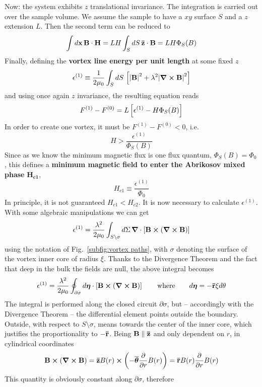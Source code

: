 Now: the system exhibits $z$ translational invariance. The integration is carried out over the sample volume. We assume the sample to have a $xy$ surface $S$ and a $z$ extension $L$. Then the second term can be reduced to
\[  
    \int d\mathbf{x} \,\mathbf{B}\cdot\mathbf{H} = LH \int_{S} dS \, \mathbf{\bar{z}}\cdot\mathbf{B} = LH \Phi_{S} (B)
\]
Finally, defining the \textbf{vortex line energy per unit length} at some fixed $z$
\[
    \epsilon^{(1)} \equiv \frac{1}{2\mu_0} \int_S dS \, \left[{ \abs{\mathbf{B}}^2 + \lambda^2 \abs{\curl\mathbf{B}}^2}\right]
\]
and using once again $z$ invariance, the resulting equation reads
\begin{equation}\label{eq:one fluxon free energy intermediate passage}
    F^{(1)} - F^{(0)} = L \left[{\epsilon^{(1)} - H \Phi_{S} (B)}\right]
\end{equation}
In order to create one vortex, it must be $F^{(1)} - F^{(0)} < 0$, i.e.
\[
    H > \frac{\epsilon^{(1)}}{\Phi_{S} (B)}
\]
Since as we know the minimum magnetic flux is one flux quantum, $\Phi_{S} (B) = \Phi_0$, this defines a \textbf{minimum magnetic field to enter the Abrikosov mixed phase} $\mathbf{H_{c1}}$,
\[
    H_{c1} \equiv \frac{\epsilon^{(1)}}{\Phi_0}
\]
In principle, it is not guaranteed $H_{c1} < H_{c2}$. It is now necessary to calculate $\epsilon^{(1)}$. With some algebraic manipulations we can get
\[  
    \epsilon^{(1)} = \frac{\lambda^2}{2\mu_0} \int_{S\setminus\sigma} d\Sigma \, \grad \cdot \left[{ \mathbf{B} \bm{\times} \left({\curl\mathbf{B}}\right) }\right]
\]
using the notation of Fig.~\ref{subfig:vortex paths}, with $\sigma$ denoting the surface of the vortex inner core of radius $\xi$. Thanks to the Divergence Theorem and the fact that deep in the bulk the fields are null, the above integral becomes
\[
    \epsilon^{(1)} = \frac{\lambda^2}{2\mu_0} \oint_{\partial\sigma} d\bm\eta \cdot \lrS{ \mathbf{B} \bm{\times} \lrR{\curl\mathbf{B}} }
    \quad\qq{where}\quad
    d\bm\eta = - \versor{r} \xi d\theta 
\]
The integral is performed along the closed circuit $\partial\sigma$, but -- accordingly with the Divergence Theorem -- the differential element points outside the boundary. Outside, with respect to $S\setminus\sigma$, means towards the center of the inner core, which justifies the proportionality to $-\mathbf{\bar{r}}$. Being $\mathbf{B}\parallel\mathbf{\bar{z}}$ and only dependent on $r$, in cylindrical coordinates
\[  
    \mathbf{B} \bm{\times} \left({\curl\mathbf{B}}\right) = \mathbf{\bar{z}} B(r) \bm\times \left({-\overline{\bm\theta} \pdv{}{r} B(r)}\right) = \mathbf{\bar{r}} B(r) \pdv{}{r} B(r)
\]
This quantity is obviously constant along $\partial\sigma$, therefore
